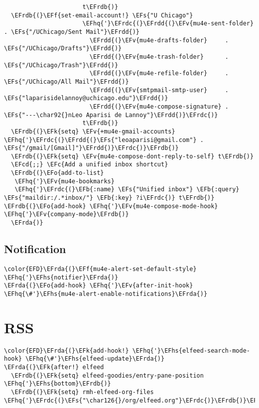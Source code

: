 \documentclass[c]{article}
\theoremstyle{plain}%
\theoremstyle{definition}
\theoremstyle{remark}
\newcommand{\EFc}[1]{\textcolor{EFc}{#1}} %
\newcommand{\EFcd}[1]{\textcolor{EFcd}{#1}} %
\newcommand{\EFs}[1]{\textcolor{EFs}{#1}} %
\newcommand{\EFk}[1]{\textcolor{EFk}{#1}} %
\newcommand{\EFb}[1]{\textcolor{EFb}{#1}} %
\newcommand{\EFf}[1]{\textcolor{EFf}{#1}} %
\newcommand{\EFv}[1]{\textcolor{EFv}{#1}} %
\newcommand{\EFo}[1]{\textcolor{EFo}{#1}} %
\newcommand{\EFhq}[1]{\textcolor{EFhq}{#1}} %
\newcommand{\EFhs}[1]{\textcolor{EFhs}{#1}} %
\newcommand{\EFrda}[1]{\textcolor{EFrda}{#1}} %
\newcommand{\EFrdb}[1]{\textcolor{EFrdb}{#1}} %
\newcommand{\EFrdc}[1]{\textcolor{EFrdc}{#1}} %
\newcommand{\EFrdd}[1]{\textcolor{EFrdd}{#1}} %
\begin{document}
\begin{Code}
\begin{Verbatim}
                      t\EFrdb{)}
  \EFrdb{(}\EFf{set-email-account!} \EFs{"U Chicago"}
                      \EFhq{'}\EFrdc{(}\EFrdd{(}\EFv{mu4e-sent-folder}       . \EFs{"/UChicago/Sent Mail"}\EFrdd{)}
                        \EFrdd{(}\EFv{mu4e-drafts-folder}     . \EFs{"/UChicago/Drafts"}\EFrdd{)}
                        \EFrdd{(}\EFv{mu4e-trash-folder}      . \EFs{"/UChicago/Trash"}\EFrdd{)}
                        \EFrdd{(}\EFv{mu4e-refile-folder}     . \EFs{"/UChicago/All Mail"}\EFrdd{)}
                        \EFrdd{(}\EFv{smtpmail-smtp-user}     . \EFs{"laparisidelannoy@uchicago.edu"}\EFrdd{)}
                        \EFrdd{(}\EFv{mu4e-compose-signature} . \EFs{"---\char92{}nLeo Aparisi de Lannoy"}\EFrdd{)}\EFrdc{)}
                      t\EFrdb{)}
  \EFrdb{(}\EFk{setq} \EFv{+mu4e-gmail-accounts} \EFhq{'}\EFrdc{(}\EFrdd{(}\EFs{"leoaparisi@gmail.com"} . \EFs{"/gmail/[Gmail]"}\EFrdd{)}\EFrdc{)}\EFrdb{)}
  \EFrdb{(}\EFk{setq} \EFv{mu4e-compose-dont-reply-to-self} t\EFrdb{)}
  \EFcd{;;} \EFc{Add a unified inbox shortcut}
  \EFrdb{(}\EFo{add-to-list}
   \EFhq{'}\EFv{mu4e-bookmarks}
   \EFhq{'}\EFrdc{(}\EFb{:name} \EFs{"Unified inbox"} \EFb{:query} \EFs{"maildir:/.*inbox/"} \EFb{:key} ?i\EFrdc{)} t\EFrdb{)}
\EFrdb{(}\EFo{add-hook} \EFhq{'}\EFv{mu4e-compose-mode-hook} \EFhq{'}\EFv{company-mode}\EFrdb{)}
  \EFrda{)}
\end{Verbatim}
\end{Code}
\subsection{Notification}
\label{sec:org94b6e66}
\begin{Code}
\begin{Verbatim}
\color{EFD}\EFrda{(}\EFf{mu4e-alert-set-default-style} \EFhq{'}\EFhs{notifier}\EFrda{)}
\EFrda{(}\EFo{add-hook} \EFhq{'}\EFv{after-init-hook} \EFhq{\#'}\EFhs{mu4e-alert-enable-notifications}\EFrda{)}
\end{Verbatim}
\end{Code}
\section{RSS}
\label{sec:orgb9d7b1b}
\begin{Code}
\begin{Verbatim}
\color{EFD}\EFrda{(}\EFk{add-hook!} \EFhq{'}\EFhs{elfeed-search-mode-hook} \EFhq{\#'}\EFhs{elfeed-update}\EFrda{)}
\EFrda{(}\EFk{after!} elfeed
  \EFrdb{(}\EFk{setq} elfeed-goodies/entry-pane-position \EFhq{'}\EFhs{bottom}\EFrdb{)}
  \EFrdb{(}\EFk{setq} rmh-elfeed-org-files \EFhq{'}\EFrdc{(}\EFs{"\char126{}/org/elfeed.org"}\EFrdc{)}\EFrdb{)}\EFrda{)}
\end{Verbatim}
\end{Code}
\end{document}
